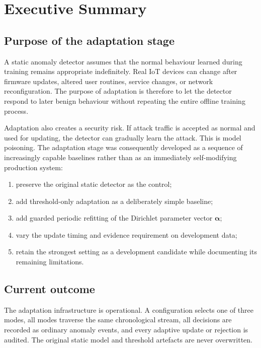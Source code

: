 \documentclass[11pt,a4paper]{article}
\begin{document}
\newpage
\tableofcontents
\newpage

\section{Executive Summary}

\subsection{Purpose of the adaptation stage}

A static anomaly detector assumes that the normal behaviour learned during
training remains appropriate indefinitely. Real IoT devices can change after
firmware updates, altered user routines, service changes, or network
reconfiguration. The purpose of adaptation is therefore to let the detector
respond to later benign behaviour without repeating the entire offline
training process.

Adaptation also creates a security risk. If attack traffic is accepted as
normal and used for updating, the detector can gradually learn the attack.
This is model poisoning. The adaptation stage was consequently developed as a
sequence of increasingly capable baselines rather than as an immediately
self-modifying production system:

\begin{enumerate}
  \item preserve the original static detector as the control;
  \item add threshold-only adaptation as a deliberately simple baseline;
  \item add guarded periodic refitting of the Dirichlet parameter vector
  $\boldsymbol{\alpha}$;
  \item vary the update timing and evidence requirement on development data;
  \item retain the strongest setting as a development candidate while
  documenting its remaining limitations.
\end{enumerate}

\subsection{Current outcome}

The adaptation infrastructure is operational. A configuration selects one of
three modes, all modes traverse the same chronological stream, all decisions
are recorded as ordinary anomaly events, and every adaptive update or rejection
is audited. The original static model and threshold artefacts are never
overwritten.
\end{document}

